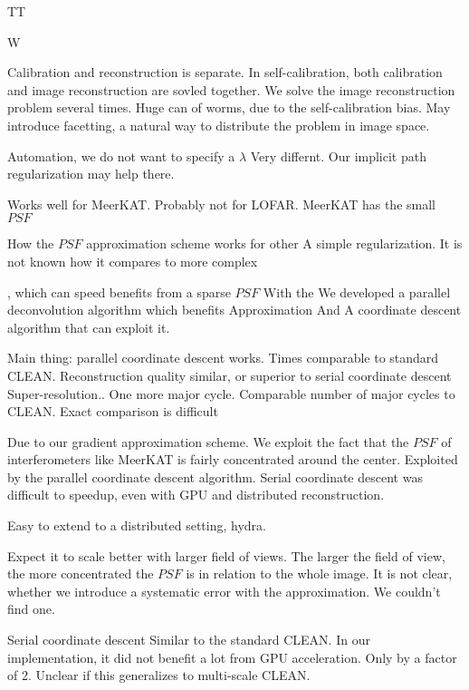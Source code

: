 TT












W

Calibration and reconstruction is separate. In self-calibration, both calibration and image reconstruction are sovled together. We solve the image reconstruction problem several times.
Huge can of worms, due to the self-calibration bias.
May introduce facetting, a natural way to distribute the problem in image space.

Automation, we do not want to specify a $\lambda$
Very differnt.
Our implicit path regularization may help there.


Works well for MeerKAT. Probably not for LOFAR. MeerKAT has the small $PSF$










How the $PSF$ approximation scheme works for other 
A simple regularization. It is not known how it compares to more complex 


 , which can speed benefits from a sparse $PSF$ With the  We developed a parallel deconvolution algorithm which benefits
Approximation
And A coordinate descent algorithm that can  exploit it.

Main thing: parallel coordinate descent works.
Times comparable to standard CLEAN.
Reconstruction quality similar, or superior to serial coordinate descent
Super-resolution..
One more major cycle.
Comparable number of major cycles to CLEAN. Exact comparison is difficult

Due to our gradient approximation scheme. We exploit the fact that the $PSF$ of interferometers like MeerKAT is fairly concentrated around the center.
Exploited by the parallel coordinate descent algorithm. 
Serial coordinate descent was difficult to speedup, even with GPU and distributed reconstruction.

Easy to extend to a distributed setting, hydra.

Expect it to scale better with larger field of views. The larger the field of view, the more concentrated the $PSF$ is in relation to the whole image.
It is not clear, whether we introduce a systematic error with the approximation. We couldn't find one.

Serial coordinate descent
Similar to the standard CLEAN.
In our implementation, it did not benefit a lot from GPU acceleration. Only by a factor of 2. Unclear if this generalizes to multi-scale CLEAN.

